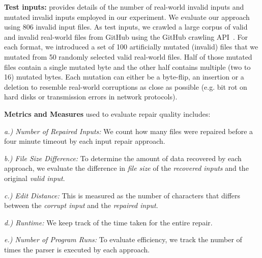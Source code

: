 \documentclass[sigconf,review,anonymous]{acmart}
\newcounter{todocounter}
\newcommand{\todo}[1]{\marginpar{$|$}\textcolor{red}{\stepcounter{todocounter}\footnote[\thetodocounter]{\textcolor{red}{\textbf{TODO }}\textit{#1}}}}
\renewcommand{\todo}[1]{}
\begin{document}
\noindent
\textbf{Test inputs:} 
 provides details of the number of
real-world invalid inputs and mutated invalid inputs employed in our experiment.
We evaluate our approach using 806 invalid input files. %
As test inputs, we crawled a large corpus of valid and invalid real-world files
from GitHub using the GitHub crawling API~\cite{githubapi}. 
For each format, we introduced a set of 100 artificially mutated (invalid) files
that we mutated from 50 randomly selected valid real-world files.
Half of those mutated files contain a single mutated byte and the other half
contains multiple (two to 16) mutated bytes.
Each mutation can either be a byte-flip, an insertion or a deletion to 
resemble real-world corruptions as close as possible
(e.g. bit rot on hard disks or transmission errors in network protocols).

\noindent\textbf{Metrics and Measures} used to evaluate repair quality includes: 

\noindent\textit{a.) Number of Repaired Inputs:} We count how many files were repaired before
a four minute timeout by each input repair approach.
 
\noindent\textit{b.) File Size Difference:} To determine the amount of data recovered by each approach, 
we evaluate the difference in \emph{file size} of
the \emph{recovered inputs} and the original
\emph{valid input}. %

\noindent\textit{c.) Edit Distance:} This is measured as the number of characters that
differs between the \emph{corrupt input} and the \emph{repaired input}.

\noindent\textit{d.) Runtime:} We keep track of the time taken for the entire repair.

\noindent\textit{e.) Number of Program Runs:} To evaluate efficiency, we track the number of times the parser is executed by each approach. 
\end{document}
